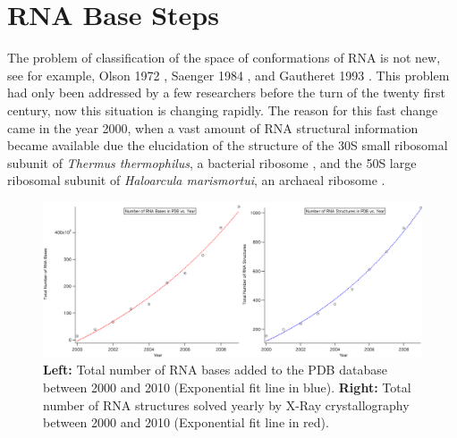 \chapter{RNA Base Steps}
\label{basesteps} 

The problem of classification of the space of conformations
of RNA  is not  new, see for  example, Olson  1972 \cite{olson1_1972},
Saenger     1984     \cite{saenger1984},     and    Gautheret     1993
\cite{gautheret1993}.  This  problem had only been addressed  by a few
researchers  before the  turn of  the twenty  first century,  now this
situation is changing rapidly. The reason for this fast change came in
the year 2000, when a vast amount of RNA structural information became
available  due the  elucidation  of  the structure  of  the 30S  small
ribosomal  subunit  of   \textit{Thermus  thermophilus},  a  bacterial
ribosome  \cite{wimberly2000,  schluenzen2000},   and  the  50S  large
ribosomal subunit of \textit{Haloarcula marismortui}, an archaeal
ribosome \cite{ban2000}.
\begin{figure}[H]
\centering
\includegraphics[scale=0.38]{Chapter2/rna2000_2009copy.png}
\caption{\textbf{Left:}  Total number of  RNA bases  added to  the PDB
  database   between  2000   and   2010  (Exponential   fit  line   in
  blue). \textbf{Right:} Total number  of RNA structures solved yearly
  by X-Ray crystallography between 2000 and 2010 (Exponential fit line
  in red).}
\label{fig:rnainpdb}
\end{figure}

